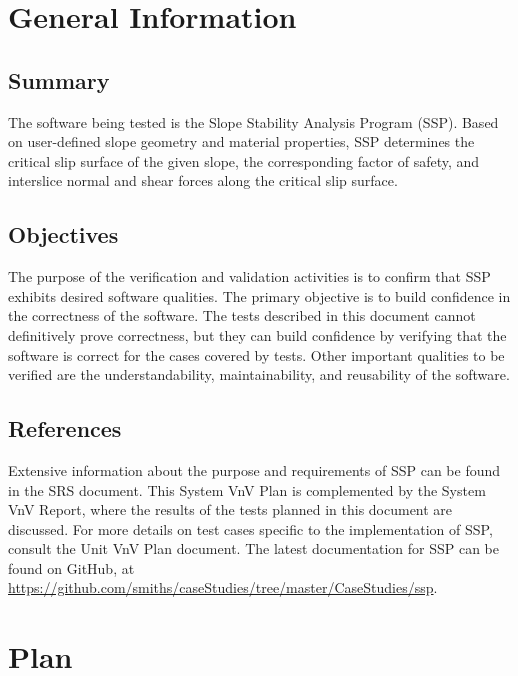 \documentclass[12pt, titlepage]{article}
\newcommand{\progname}{SSP}
\begin{document}
\section{General Information} \label{sec_GenInfo}

\subsection{Summary}

\noindent The software being tested is the Slope Stability Analysis Program 
(\progname{}). Based on user-defined slope geometry and material properties, 
\progname{} determines the critical slip surface of the given slope, the 
corresponding factor of safety, and interslice normal and shear forces along 
the critical slip surface.

\subsection{Objectives}

\noindent The purpose of the verification and validation activities is to 
confirm that \progname{} exhibits desired software qualities. The primary 
objective is to build confidence in the correctness of the software. The tests 
described in this document cannot definitively prove correctness, but they can 
build confidence by verifying that the software is correct for the cases 
covered by tests. Other important qualities to be verified are the 
understandability, maintainability, and reusability of the software.

\subsection{References}

\noindent Extensive information about the purpose and requirements of 
\progname{} can be found in the SRS document. This System VnV Plan is 
complemented by the System VnV Report, where the results of the tests planned 
in this document are discussed. For more details on test cases specific to the 
implementation of \progname{}, consult the Unit VnV Plan document. The latest 
documentation for \progname{} can be found on GitHub, at \newline 
\href{https://github.com/smiths/caseStudies/tree/master/CaseStudies/ssp}{https://github.com/smiths/caseStudies/tree/master/CaseStudies/ssp}.

\section{Plan} \label{sec_Plan}
	
\end{document}
